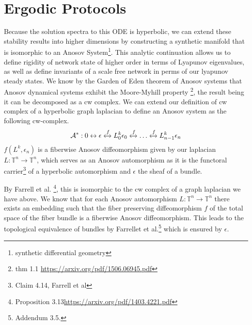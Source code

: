 \documentclass{article}
\begin{document}
\section{Ergodic Protocols}
Because the solution spectra to this ODE is hyperbolic, we can extend these stability results into higher dimensions by constructing a synthetic manifold that is isomorphic to an Anosov System\footnote{synthetic differential geometry}. This analytic continuation allows us to define rigidity of network state of higher order in terms of Lyapunov eigenvalues, as well as define invariants of a scale free network in perms of our lyapunov steady states. We know by the Garden of Eden theorem of Anosov systems that Anosov dynamical systems exhibit the Moore-Myhill property \footnote{thm 1.1 \url{https://arxiv.org/pdf/1506.06945.pdf}}, the result being it can be decomposed as a cw complex. We can extend our definition of cw complex of a hyperbolic graph laplacian to define an Anosov system as the following cw-complex.
\begin{equation} \label{eq1}
\begin{split}
\mathcal{A}^* : 0 \leftrightarrow \epsilon \xleftrightarrow{f} L^k_0 \epsilon_0 \xleftrightarrow{f} \dots  \xleftrightarrow{f} L^k_{n-1} \epsilon_n
\end{split}
\end{equation}
$f(L^{k}, \epsilon_n)$ is a fiberwise Anosov diffeomorphism given by our laplacian $L: \mathbb{T}^n \rightarrow \mathbb{T}^n$, which serves as an Anosov automorphism as it is the functoral carrier\footnote{Claim 4.14, Farrell et al} of a hyperbolic automorphism and $\epsilon$ the sheaf of a bundle. 

By Farrell et al. \footnote{Proposition 3.13\url{https://arxiv.org/pdf/1403.4221.pdf}}, this is isomorphic to the cw complex of a graph laplacian we have above. We know that for each Anosov automorphism $L: \mathbb{T}^n \rightarrow \mathbb{T}^n$ there exists an embedding such that the fiber preserving diffeomorphism $f$ of the total space of the fiber bundle is a fiberwise Anosov diffeomorphism. This leads to the topological equivalence of bundles by Farrellet et al.\footnote{Addendum 3.5.} which is ensured by $\epsilon$.
\end{document}

